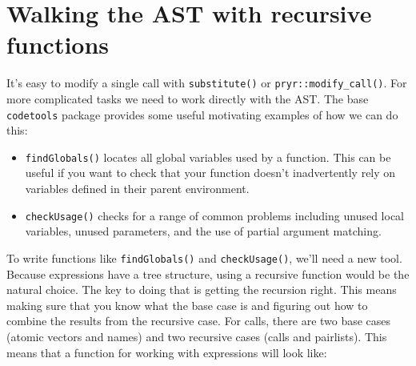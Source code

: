 \hypertarget{ast-funs}{%
\section{Walking the AST with recursive functions}\label{ast-funs}}

It's easy to modify a single call with \texttt{substitute()} or
\texttt{pryr::modify\_call()}. For more complicated tasks we need to
work directly with the AST. The base \texttt{codetools} package provides
some useful motivating examples of how we can do this:

\begin{itemize}
\item
  \texttt{findGlobals()} locates all global variables used by a
  function. This can be useful if you want to check that your function
  doesn't inadvertently rely on variables defined in their parent
  environment.
\item
  \texttt{checkUsage()} checks for a range of common problems including
  unused local variables, unused parameters, and the use of partial
  argument matching.
\end{itemize}

To write functions like \texttt{findGlobals()} and
\texttt{checkUsage()}, we'll need a new tool. Because expressions have a
tree structure, using a recursive function would be the natural choice.
The key to doing that is getting the recursion right. This means making
sure that you know what the base case is and figuring out how to combine
the results from the recursive case. For calls, there are two base cases
(atomic vectors and names) and two recursive cases (calls and
pairlists). This means that a function for working with expressions will
look like:

\begin{Shaded}
\begin{Highlighting}[]
\StringTok{ }
  \NormalTok{ (}
\NormalTok{  \} } \NormalTok{ (}
\NormalTok{  \} } \NormalTok{ (}
\NormalTok{  \} } \NormalTok{ (}
\NormalTok{  \} }\NormalTok{ \{}
    \NormalTok{(}\NormalTok{, }
       \NormalTok{)}
\NormalTok{  \}}
\NormalTok{\}}
\end{Highlighting}
\end{Shaded}

